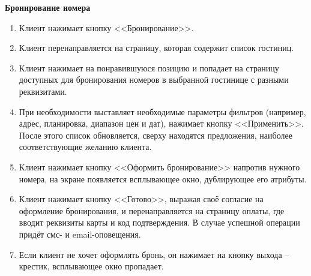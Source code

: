 \textbf{Бронирование номера}
\begin{enumerate}
	\item Клиент нажимает кнопку <<Бронирование>>.
	
	\item Клиент перенаправляется на страницу, которая содержит список гостиниц.
	
	\item Клиент нажимает на понравившуюся позицию и попадает на страницу доступных для бронирования номеров в выбранной гостинице с разными реквизитами.
	
	\item При необходимости выставляет необходимые параметры фильтров (например, адрес, планировка, диапазон цен и дат), нажимает кнопку <<Применить>>. После этого список обновляется, сверху находятся предложения, наиболее соответствующие желанию клиента.
	
	\item Клиент нажимает кнопку <<Оформить бронирование>> напротив нужного номера, на экране появляется всплывающее окно, дублирующее его атрибуты.
	
	\item Клиент нажимает кнопку <<Готово>>, выражая своё согласие на оформление бронирования, и перенаправляется на страницу оплаты, где вводит реквизиты карты и код подтверждения. В случае успешной операции придёт смс- и email-оповещения.
	
	\item Если клиент не хочет оформлять бронь, он нажимает на кнопку выхода -- крестик, всплывающее окно пропадает.
\end{enumerate}



\pagebreak